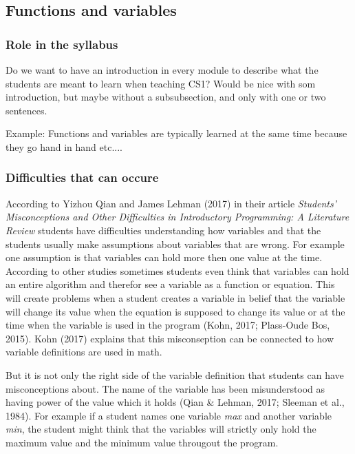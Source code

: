 \documentclass[twocolumn]{article}
\begin{document}
\subsection{Functions and variables}

\subsubsection{Role in the syllabus}

Do we want to have an introduction in every module to describe what the students are meant to learn when teaching CS1? Would be nice with som introduction, but maybe without a subsubsection, and only with one or two sentences. 

Example: Functions and variables are typically learned at the same time because they go hand in hand etc....

\subsubsection{Difficulties that can occure}

According to Yizhou Qian and James Lehman (2017) in their article \emph{Students’ Misconceptions and Other Difficulties in Introductory Programming: A Literature Review} students have difficulties understanding how variables and that the students usually make assumptions about variables that are wrong. For example one assumption is that variables can hold more then one value at the time. According to other studies sometimes students even think that variables can hold an entire algorithm and therefor see a variable as a function or equation. This will create problems when a student creates a variable in belief that the variable will change its value when the equation is supposed to change its value or at the time when the variable is used in the program (Kohn, 2017; Plass-Oude Bos, 2015). Kohn (2017) explains that this misconseption can be connected to how variable definitions are used in math. 

But it is not only the right side of the variable definition that students can have misconceptions about. The name of the variable has been misunderstood as having power of the value which it holds (Qian \& Lehman, 2017; Sleeman et al., 1984). For example if a student names one variable \emph{max} and another variable \emph{min}, the student might think that the variables will strictly only hold the maximum value and the minimum value througout the program. 
\end{document}
